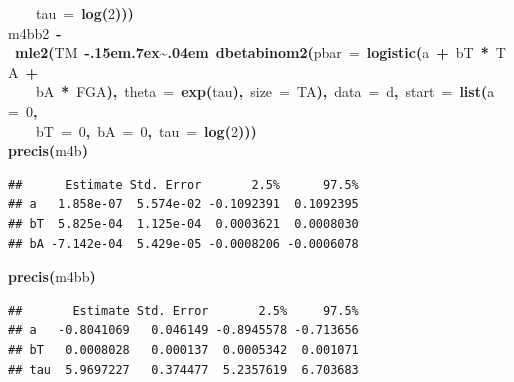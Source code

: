 \documentclass{article}
\makeatletter
\newcommand{\hlnumber}[1]{\textcolor[rgb]{0,0,0}{#1}}%
\newcommand{\hlfunctioncall}[1]{\textcolor[rgb]{.5,0,.33}{\textbf{#1}}}%
\newcommand{\hlkeyword}[1]{\textbf{#1}}%
\newcommand{\hlargument}[1]{\textcolor[rgb]{.69,.25,.02}{#1}}%
\newcommand{\hlassignement}[1]{\textbf{#1}}%
\newcommand{\hlsymbol}[1]{#1}%
\def\urltilda{\kern -.15em\lower .7ex\hbox{\~{}}\kern .04em}%
\newcommand{\hlstd}[1]{\textcolor[rgb]{0,0,0}{#1}}%
\newenvironment{kframe}{%
 \def\FrameCommand##1{\hskip\@totalleftmargin \hskip-\fboxsep
 \colorbox{shadecolor}{##1}\hskip-\fboxsep
     \hskip-\linewidth \hskip-\@totalleftmargin \hskip\columnwidth}%
 \MakeFramed {\advance\hsize-\width
   \@totalleftmargin\z@ \linewidth\hsize
   \@setminipage}}%
 {\par\unskip\endMakeFramed}
\newenvironment{knitrout}{}{} %
\makeatother
\begin{document}
\begin{knitrout}
{\begin{kframe}
\begin{flushleft}
\hlstd{}{\ }{\ }{\ }{\ }\hlargument{tau}{\ }\hlargument{=}{\ }\hlfunctioncall{log}\hlkeyword{(}\hlnumber{2}\hlkeyword{)}\hlkeyword{)}\hlkeyword{)}\hspace*{\fill}\\
\hlstd{}\hlsymbol{m4bb2}{\ }\hlassignement{\usebox{\hlnormalsizeboxlessthan}-}{\ }\hlfunctioncall{mle2}\hlkeyword{(}\hlsymbol{TM}{\ }\hlkeyword{\urltilda{}}{\ }\hlfunctioncall{dbetabinom2}\hlkeyword{(}\hlargument{pbar}{\ }\hlargument{=}{\ }\hlfunctioncall{logistic}\hlkeyword{(}\hlsymbol{a}{\ }\hlkeyword{+}{\ }\hlsymbol{bT}{\ }\hlkeyword{*}{\ }\hlsymbol{TA}{\ }\hlkeyword{+}\hspace*{\fill}\\
\hlstd{}{\ }{\ }{\ }{\ }\hlsymbol{bA}{\ }\hlkeyword{*}{\ }\hlsymbol{FGA}\hlkeyword{)}\hlkeyword{,}{\ }\hlargument{theta}{\ }\hlargument{=}{\ }\hlfunctioncall{exp}\hlkeyword{(}\hlsymbol{tau}\hlkeyword{)}\hlkeyword{,}{\ }\hlargument{size}{\ }\hlargument{=}{\ }\hlsymbol{TA}\hlkeyword{)}\hlkeyword{,}{\ }\hlargument{data}{\ }\hlargument{=}{\ }\hlsymbol{d}\hlkeyword{,}{\ }\hlargument{start}{\ }\hlargument{=}{\ }\hlfunctioncall{list}\hlkeyword{(}\hlargument{a}{\ }\hlargument{=}{\ }\hlnumber{0}\hlkeyword{,}\hspace*{\fill}\\
\hlstd{}{\ }{\ }{\ }{\ }\hlargument{bT}{\ }\hlargument{=}{\ }\hlnumber{0}\hlkeyword{,}{\ }\hlargument{bA}{\ }\hlargument{=}{\ }\hlnumber{0}\hlkeyword{,}{\ }\hlargument{tau}{\ }\hlargument{=}{\ }\hlfunctioncall{log}\hlkeyword{(}\hlnumber{2}\hlkeyword{)}\hlkeyword{)}\hlkeyword{)}\hspace*{\fill}\\
\hlstd{}\hlfunctioncall{precis}\hlkeyword{(}\hlsymbol{m4b}\hlkeyword{)}\mbox{}
\normalfont
\end{flushleft}
\begin{verbatim}
##      Estimate Std. Error       2.5%      97.5%
## a   1.858e-07  5.574e-02 -0.1092391  0.1092395
## bT  5.825e-04  1.125e-04  0.0003621  0.0008030
## bA -7.142e-04  5.429e-05 -0.0008206 -0.0006078
\end{verbatim}
\begin{flushleft}
\ttfamily\noindent
\hlfunctioncall{precis}\hlkeyword{(}\hlsymbol{m4bb}\hlkeyword{)}\mbox{}
\normalfont
\end{flushleft}
\begin{verbatim}
##       Estimate Std. Error       2.5%     97.5%
## a   -0.8041069   0.046149 -0.8945578 -0.713656
## bT   0.0008028   0.000137  0.0005342  0.001071
## tau  5.9697227   0.374477  5.2357619  6.703683

\end{verbatim}
\end{kframe}}
\end{knitrout}
\end{document}
